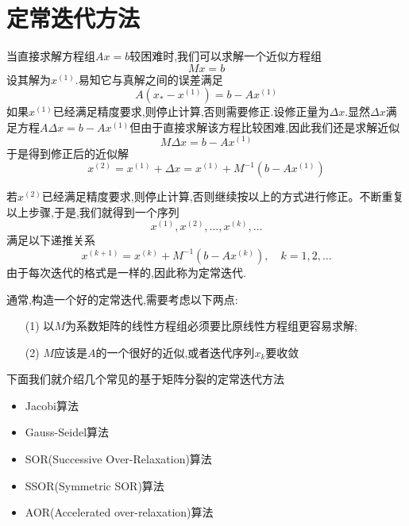 \documentclass[notheorems,serif]{beamer}
\begin{document}
\section{定常迭代方法}
\begin{frame}
当直接求解方程组$Ax=b$较困难时,我们可以求解一个近似方程组
$$
M x=b
$$
设其解为$x^{(1)}$.易知它与真解之间的误差满足
$$
A\left(x_{*}-x^{(1)}\right)=b-A x^{(1)}
$$
如果$x^{(1)}$已经满足精度要求,则停止计算,否则需要修正.设修正量为$\Delta x$.显然$\Delta x$满足方程$A \Delta x=b-A x^{(1)}$但由于直接求解该方程比较困难,因此我们还是求解近似
$$
M \Delta x=b-A x^{(1)}
$$
于是得到修正后的近似解
$$x^{(2)}=x^{(1)}+\Delta x=x^{(1)}+M^{-1}\left(b-A x^{(1)}\right)$$
\end{frame}

\begin{frame}
若$x^{(2)}$已经满足精度要求,则停止计算,否则继续按以上的方式进行修正。不断重复以上步骤,于是,我们就得到一个序列
$$
x^{(1)}, x^{(2)}, \ldots, x^{(k)}, \ldots
$$
满足以下递推关系
$$
x^{(k+1)}=x^{(k)}+M^{-1}\left(b-A x^{(k)}\right), \quad k=1,2, \ldots
$$
{\color{blue}由于每次迭代的格式是一样的,因此称为\quad 定常迭代.}
\end{frame}

\begin{frame}
通常,构造一个好的定常迭代,需要考虑以下两点:
\begin{itemize}
\item[(1)]\quad 以$M$为系数矩阵的线性方程组必须要比原线性方程组更容易求解;

\item[(2)]\quad $M$应该是$A$的一个很好的近似,或者迭代序列${x_k}$要收敛
\end{itemize}
\end{frame}


\begin{frame}
下面我们就介绍几个常见的基于矩阵分裂的定常迭代方法
\begin{itemize}
\item Jacobi算法
\item Gauss-Seidel算法
\item SOR(Successive Over-Relaxation)算法
\item SSOR(Symmetric SOR)算法
\item AOR(Accelerated over-relaxation)算法
\end{itemize}

\end{frame}
\end{document}

